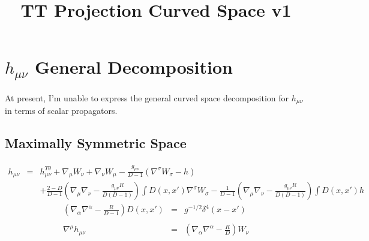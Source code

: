 \documentclass[10pt,letterpaper]{article}
\title{TT Projection Curved Space v1}
\date{}
\numberwithin{equation}{section}
\begin{document}
 
\maketitle
\noindent 
\section{$h_{\mu\nu}$ General Decomposition}
%
%
At present, I'm unable to express the general curved space decomposition for $h_{\mu\nu}$ in terms of scalar propagators.
\subsection{Maximally Symmetric Space}
\begin{eqnarray}
h_{\mu\nu} &=& h_{\mu\nu}^{T\theta} + \nabla_\mu W_\nu + \nabla_\nu W_\mu - \frac{g_{\mu\nu}}{D-1}(\nabla^\sigma W_\sigma - h)
\nonumber\\
&& +\frac{2-D}{D-1}\left( \nabla_\mu\nabla_\nu -\frac{ g_{\mu\nu}R}{D(D-1)}\right) \int D(x,x') \nabla^\sigma W_\sigma
-\frac{1}{D-1}\left( \nabla_\mu\nabla_\nu -\frac{g_{\mu\nu}R}{D(D-1)}\right) \int D(x,x') h
\label{decomphmax}
\end{eqnarray}
\begin{eqnarray}
\left( \nabla_\alpha \nabla^\alpha - \frac{R}{D-1}\right)D(x,x') &=& g^{-1/2}\delta^4 (x-x')
\nonumber\\ \nonumber\\
\nabla^\mu h_{\mu\nu} &=& \left( \nabla_\alpha\nabla^\alpha-\frac{R}{D} \right) W_\nu
\end{eqnarray}
%
%
\end{document}
